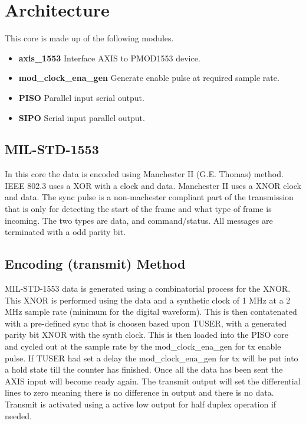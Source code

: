 \section{Architecture}
\par
This core is made up of the following modules.
\begin{itemize} 
  \item \textbf{axis\_1553} Interface AXIS to PMOD1553 device.
  \item \textbf{mod\_clock\_ena\_gen} Generate enable pulse at required sample rate.
  \item \textbf{PISO} Parallel input serial output.
  \item \textbf{SIPO} Serial input parallel output.
\end{itemize}

\subsection{MIL-STD-1553}
\par
In this core the data is encoded using Manchester II (G.E. Thomas) method. IEEE 802.3 uses a XOR with a clock and data. Manchester II uses a XNOR clock and data. The sync pulse is a non-machester compliant
part of the transmission that is only for detecting the start of the frame and what type of frame is incoming. The two types are data, and command/status. All messages are terminated with a odd parity bit.

\subsection{Encoding (transmit) Method}
\par
MIL-STD-1553 data is generated using a combinatorial process for the XNOR. This XNOR is performed using the data and a synthetic clock of 1 MHz at a 2 MHz sample rate (minimum for the digital waveform).
This is then contatenated with a pre-defined sync that is choosen based upon TUSER, with a generated parity bit XNOR with the synth clock. This is then loaded into the PISO core and cycled out at the sample
rate by the mod\_clock\_ena\_gen for tx enable pulse. If TUSER had set a delay the mod\_clock\_ena\_gen for tx will be put into a hold state till the counter has finished. Once all the data has been sent the
AXIS input will become ready again. The transmit output will set the differential lines to zero meaning there is no difference in output and there is no data. Transmit is activated using a active low output
for half duplex operation if needed.

